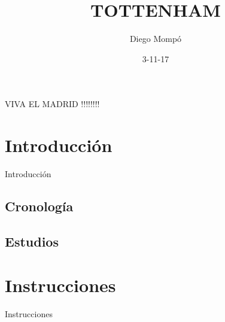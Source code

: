 \documentclass[10pt,a4paper]{article}
\title{TOTTENHAM}
\author{Diego Mompó}
\date{3-11-17}
\begin{document}
\maketitle
VIVA EL MADRID !!!!!!!!
\section{Introducción}
Introducción
\subsection{Cronología}
\subsection{Estudios}
\section{Instrucciones}
Instrucciones
\end{document}
